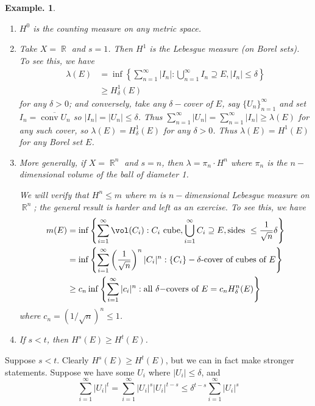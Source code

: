 \documentclass[11pt, a4paper]{memoir}
\DeclareMathOperator{\R}{{\mathbb{R}}}
\theoremstyle{change}
\theoremstyle{plain}
\theoremstyle{nonumberplain}
\newtheorem{example}{Example.}
\DeclareMathOperator{\conv}{conv}
\numberwithin{equation}{section}
\begin{document}
\begin{example}
    \begin{enumerate}[nl,r]
        \item $H^0$ is the counting measure on any metric space.
        \item Take $X=\R$ and $s=1$.
            Then $H^1$ is the Lebesgue measure (on Borel sets).
            To see this, we have
            \begin{align*}
                \lambda(E) &= \inf\left\{\sum_{n=1}^\infty |I_n|:\bigcup_{n=1}^\infty I_n\supseteq E, |I_n|\leq\delta\right\}\\
                           &\geq H^1_\delta(E)
            \end{align*}
            for any $\delta>0$; and conversely, take any $\delta-$cover of $E$, say $\{U_n\}_{n=1}^\infty$ and set $I_n=\overline{\conv U_n}$ so $|I_n|=|U_n|\leq\delta$.
            Thus $\sum_{n=1}^\infty|U_n|=\sum_{n=1}^\infty|I_n|\geq\lambda(E)$ for any such cover, so $\lambda(E)=H_\delta^1(E)$ for any $\delta>0$.
            Thus $\lambda(E)=H^1(E)$ for any Borel set $E$.
        \item More generally, if $X=\R^n$ and $s=n$, then $\lambda=\pi_n\cdot H^n$ where $\pi_n$ is the $n-$dimensional volume of the ball of diameter 1.

            We will verify that $H^n\leq m$ where $m$ is $n-$dimensional Lebesgue measure on $\R^n$; the general result is harder and left as an exercise.
            To see this, we have
            \begin{align*}
                m(E)&=\inf\left\{\sum_{i=1}^\infty\vol(C_i):C_i\text{ cube},\bigcup_{i=1}^\infty C_i\supseteq E,\text{sides }\leq\frac{1}{\sqrt{n}}\delta\right\}\\
                    &=\inf\left\{\sum_{i=1}^\infty\left(\frac{1}{\sqrt{n}}\right)^n|C_i|^n:\{C_i\}-\delta\text{-cover of cubes of }E\right\}\\
                    &\geq c_n\inf\left\{\sum_{i=1}^\infty|c_i|^n:\text{all $\delta-$covers of }E=c_nH_\delta^n(E)\right\}
            \end{align*}
            where $c_n=(1/\sqrt{n})^n\leq 1$.
        \item If $s<t$, then $H^s(E)\geq H^t(E)$.
    \end{enumerate}
\end{example}
Suppose $s<t$.
Clearly $H^s(E)\geq H^t(E)$, but we can in fact make stronger statements.
Suppose we have some $U_i$ where $|U_i|\leq\delta$, and
\begin{equation*}
    \sum_{i=1}^\infty|U_i|^t=\sum_{i=1}^\infty|U_i|^s|U_i|^{t-s}\leq\delta^{t-s}\sum_{i=1}^\infty|U_i|^s
\end{equation*}
\end{document}
